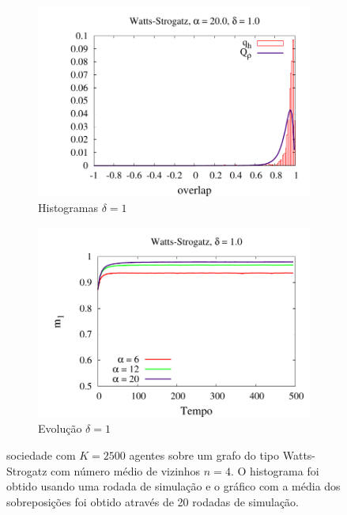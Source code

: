 \begin{figure}
\begin{subfigure}[]{0.45\textwidth}
        \includegraphics[width=\textwidth]{Figures/HistoDeltaD1Beta20}
        \caption{Histogramas $\delta = 1$}
    \end{subfigure}
    \begin{subfigure}[]{0.45\textwidth}
        \centering
        \includegraphics[width=\textwidth]{Figures/MagD1Beta}
        \caption{Evolução $\delta = 1$}
    \end{subfigure}
    \newline
    \caption{
        sociedade com $K=2500$ agentes sobre um grafo do tipo Watts-Strogatz
        com número médio de vizinhos $n=4$. O histograma foi obtido usando uma
        rodada de simulação e o gráfico com a média dos sobreposições foi obtido
        através de 20 rodadas de simulação.
        }
    \label{fig:DDSeparado}
\end{figure}

